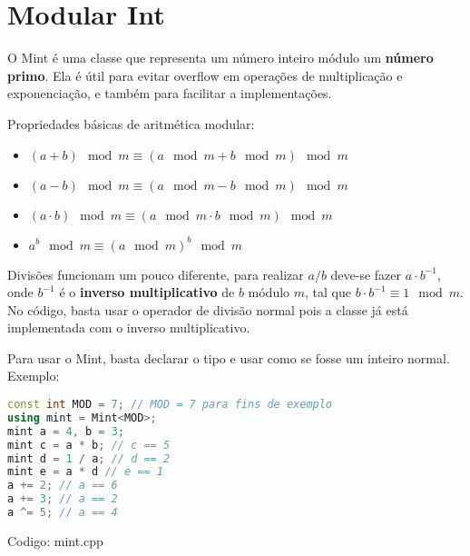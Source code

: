 \documentclass[10pt, a4paper, oneside]{book}
\begin{document}
\section{Modular Int}


O Mint é uma classe que representa um número inteiro módulo um \textbf{número primo}. Ela é útil para evitar overflow em operações de multiplicação e exponenciação, e também para facilitar a implementações.



Propriedades básicas de aritmética modular:

\begin{itemize}
\item $(a + b) \mod m \equiv (a \mod m + b \mod m) \mod m$
\item $(a - b) \mod m \equiv (a \mod m - b \mod m) \mod m$
\item $(a \cdot b) \mod m \equiv (a \mod m \cdot b \mod m) \mod m$
\item $a^b \mod m \equiv (a \mod m)^b \mod m$
\end{itemize}



Divisões funcionam um pouco diferente, para realizar $a/b$ deve-se fazer $a \cdot b^{-1}$, onde $b^{-1}$ é o \textbf{inverso multiplicativo} de $b$ módulo $m$, tal que $b \cdot b^{-1} \equiv 1 \mod m$. No código, basta usar o operador de divisão normal pois a classe já está implementada com o inverso multiplicativo.



Para usar o Mint, basta declarar o tipo e usar como se fosse um inteiro normal. Exemplo:



\begin{lstlisting}[language=C++]
const int MOD = 7; // MOD = 7 para fins de exemplo
using mint = Mint<MOD>;
mint a = 4, b = 3;
mint c = a * b; // c == 5
mint d = 1 / a; // d == 2
mint e = a * d // e == 1
a += 2; // a == 6
a += 3; // a == 2
a ^= 5; // a == 4
\end{lstlisting}

\hfill

Codigo: mint.cpp
\end{document}
